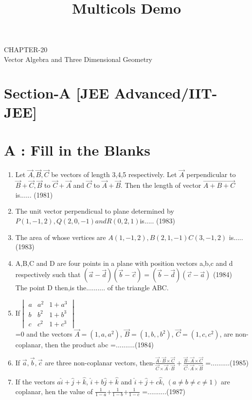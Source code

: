 \documentclass[12pt]{article}
\title{Multicols Demo}
\providecommand{\brak}[1]{\ensuremath{\left(#1\right)}}
\begin{document}
\begin{center}
\textbf\large{CHAPTER-20 \\ Vector Algebra and
 Three Dimensional Geometry}

\end{center}
\section*{Section-A    [JEE Advanced/IIT-JEE]}
\section*{A    :  Fill in the Blanks}
\begin{enumerate}
\item Let $\vec{A},\vec{B},\vec{C}$ be vectors of length 3,4,5 respectively. Let $\vec{A}$ perpendicular to $\vec{B}+\vec{C},\vec{B}$ to $\vec{C}+\vec{A}$ and $\vec{C}$ to $\vec{A}+\vec{B}$. Then  the length of vector $\vec{A+B+C}$ is......     (1981)
\item The unit vector perpendicual to plane determined by $P(1,-1,2),Q(2,0,-1) and R(0,2,1)$is.....     (1983)
\item The area of whose vertices are $A(1,-1,2),B(2,1,-1)C(3,-1,2)$ is.....(1983)
\item A,B,C and D are four points in a plane with position vectors a,b,c and d respectively such that   $\brak{\vec{a}-\vec{d}}\brak{\vec{b}-\vec{c}}=\brak{\vec{b}-\vec{d}}\brak{\vec{c}-\vec{a}}$   (1984)\\
The point D then,is the.......... of the triangle ABC.
\item If$\begin{vmatrix}
 a & a^2 & 1+a^3\\
 b & b^2 & 1+b^3\\
 c & c^2 & 1+c^3
\end{vmatrix}$ \\ =0 and the vectors $\vec{A}=(1,a,a^2)$, $\vec{B}=(1,b,,b^2)$, $\vec{C}=(1,c,c^2)$, are non-coplanar, then the product abc =..........(1984)
\item If $\vec{a}, \vec{b}, \vec{c}$ are three non-coplanar vectors, then-$\frac{\vec{A}\cdot\vec{B}\times\vec{C}}{\vec{C}\times\vec{A}\cdot\vec{B}}+\frac{\vec{B}\cdot\vec{A}\times\vec{C}}{\vec{C}\cdot\vec{A}\times\vec{B}}$ =..........(1985)
\item If the vectors $a\hat{i}+\hat{j}+\hat{k}$, $\hat{i}+b\hat{j}+\hat{k}$ and $\hat{i}+\hat{j}+c\hat{k}$, $(a\neq b\neq c\neq 1)$ are coplanar, hen the value of $\frac{1}{1-a}$+$\frac{1}{1-b}$+$\frac{1}{1-c}$ =..........(1987)

\end{enumerate}
\end{document}
